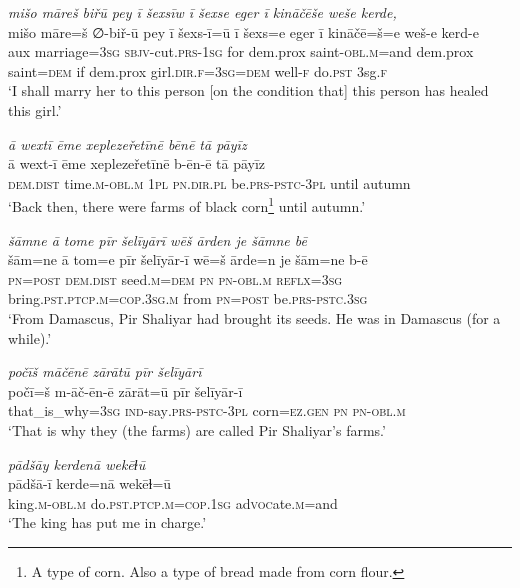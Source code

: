 \ea \label{ZP.90}
\textit{mišo māreš biřū pey ī šexsīw ī šexse eger ī kināčēše weše kerde,} \\ 
\gll mišo māre=š ∅-biř-ū pey ī šexs-ī=ū ī šexs=e eger ī kināčē=š=e weš-e kerd-e \\ 
 aux marriage\textsc{=3sg} \textsc{sbjv-}cut\textsc{.prs}\textsc{-\textsc{1sg}} for dem.prox saint\textsc{-obl}\textsc{.m}=and dem.prox saint\textsc{=dem} if dem.prox girl\textsc{.dir}\textsc{.f}\textsc{=3sg}\textsc{=dem} well\textsc{-f} do\textsc{.pst} 3sg\textsc{.f} \\ 
\glt `I shall marry her to this person [on the condition that] this person has healed this girl.'
\z 
 
\ea \label{ZP.94}
\textit{ā wextī ēme xeplezeřetīnē bēnē tā pāyīz} \\ 
\gll ā wext-ī ēme xeplezeřetīnē b-ēn-ē tā pāyīz \\ 
 \textsc{dem.dist} time\textsc{.m}\textsc{-obl}\textsc{.m} \textsc{1pl} \textsc{pn}\textsc{.dir}\textsc{.pl} be\textsc{.prs}\textsc{-pstc}\textsc{-3pl} until autumn \\ 
\glt `Back then, there were farms of black corn\footnote{A type of corn. Also a type of bread made from corn flour.} until autumn.'
\z 
 
\ea \label{ZP.95}
\textit{šāmne ā tome pīr šelīyārī wēš ārden je šāmne bē} \\ 
\gll šām=ne ā tom=e pīr šelīyār-ī wē=š ārde=n je šām=ne b-ē \\ 
 \textsc{pn}\textsc{=\textsc{post}} \textsc{dem.dist} seed\textsc{.m}\textsc{=dem} \textsc{pn} \textsc{pn}\textsc{-obl}\textsc{.m} \textsc{reflx}\textsc{=3sg} bring\textsc{.pst}\textsc{.ptcp}\textsc{.m}\textsc{=cop}\textsc{.3sg}\textsc{.m} from \textsc{pn}\textsc{=\textsc{post}} be\textsc{.prs}\textsc{-pstc}\textsc{.3sg} \\ 
\glt `From Damascus, Pir Shaliyar had brought its seeds. He was in Damascus (for a while).'
\z 
 
\ea \label{ZP.96}
\textit{počīš māčēnē zārātū pīr šelīyārī} \\ 
\gll počī=š m-āč-ēn-ē zārāt=ū pīr šelīyār-ī \\ 
 that\_is\_why\textsc{=3sg} \textsc{ind-}say\textsc{.prs}\textsc{-pstc}\textsc{-3pl} corn\textsc{\textsc{=ez.gen}} \textsc{pn} \textsc{pn}\textsc{-obl}\textsc{.m} \\ 
\glt `That is why they (the farms) are called Pir Shaliyar’s farms.'
\z 
 
\ea \label{ZP.99}
\textit{pādšāy kerdenā wekēɫū} \\ 
\gll pādšā-ī kerde=nā wekēɫ=ū \\ 
 king\textsc{.m}\textsc{-obl}\textsc{.m} do\textsc{.pst}\textsc{.ptcp}\textsc{.m}\textsc{=cop}\textsc{.\textsc{1sg}} ad\textsc{voc}ate\textsc{.m}=and \\ 
\glt `The king has put me in charge.'
\z 
 
